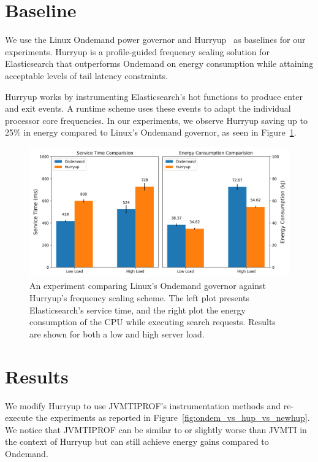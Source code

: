 \section{Baseline}

We use the Linux Ondemand power governor and Hurryup~\cite{hurryupccgrid} as baselines for our experiments. Hurryup is a profile-guided frequency scaling solution for Elasticsearch that outperforms Ondemand on energy consumption while attaining acceptable levels of tail latency constraints.

Hurryup works by instrumenting Elasticsearch's hot functions to produce enter and exit events. A runtime scheme uses these events to adapt the individual processor core frequencies. In our experiments, we observe Hurryup saving up to 25\% in energy compared to Linux's Ondemand governor, as seen in Figure~\ref{fig:ondem_vs_hup}.

\begin{figure}[hb]
\centering
\includegraphics[width=1.0\textwidth]{src/figure/ondem_vs_hup.png}
\caption{An experiment comparing Linux's Ondemand governor against Hurryup's frequency scaling scheme. The left plot presents Elasticsearch's service time, and the right plot the energy consumption of the CPU while executing search requests. Results are shown for both a low and high server load.}
\label{fig:ondem_vs_hup}
\end{figure}

\section{Results}

We modify Hurryup to use JVMTIPROF's instrumentation methods and re-execute the experiments as reported in Figure~\ref{fig:ondem_vs_hup_vs_newhup}. We notice that JVMTIPROF can be similar to or slightly worse than JVMTI in the context of Hurryup but can still achieve energy gains compared to Ondemand.

